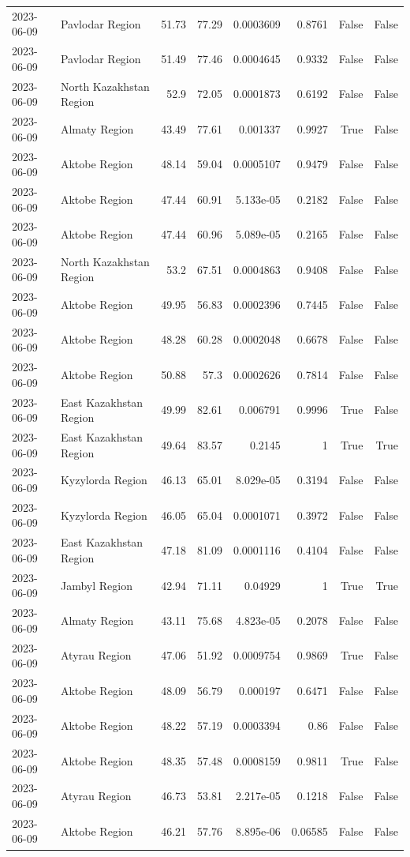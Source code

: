 \begin{table}
\begin{tabular}{llrrrrrr}
2023-06-09 & Pavlodar Region & 51.73 & 77.29 & 0.0003609 & 0.8761 & False & False \\
2023-06-09 & Pavlodar Region & 51.49 & 77.46 & 0.0004645 & 0.9332 & False & False \\
2023-06-09 & North Kazakhstan Region & 52.9 & 72.05 & 0.0001873 & 0.6192 & False & False \\
2023-06-09 & Almaty Region & 43.49 & 77.61 & 0.001337 & 0.9927 & True & False \\
2023-06-09 & Aktobe Region & 48.14 & 59.04 & 0.0005107 & 0.9479 & False & False \\
2023-06-09 & Aktobe Region & 47.44 & 60.91 & 5.133e-05 & 0.2182 & False & False \\
2023-06-09 & Aktobe Region & 47.44 & 60.96 & 5.089e-05 & 0.2165 & False & False \\
2023-06-09 & North Kazakhstan Region & 53.2 & 67.51 & 0.0004863 & 0.9408 & False & False \\
2023-06-09 & Aktobe Region & 49.95 & 56.83 & 0.0002396 & 0.7445 & False & False \\
2023-06-09 & Aktobe Region & 48.28 & 60.28 & 0.0002048 & 0.6678 & False & False \\
2023-06-09 & Aktobe Region & 50.88 & 57.3 & 0.0002626 & 0.7814 & False & False \\
2023-06-09 & East Kazakhstan Region & 49.99 & 82.61 & 0.006791 & 0.9996 & True & False \\
2023-06-09 & East Kazakhstan Region & 49.64 & 83.57 & 0.2145 & 1 & True & True \\
2023-06-09 & Kyzylorda Region & 46.13 & 65.01 & 8.029e-05 & 0.3194 & False & False \\
2023-06-09 & Kyzylorda Region & 46.05 & 65.04 & 0.0001071 & 0.3972 & False & False \\
2023-06-09 & East Kazakhstan Region & 47.18 & 81.09 & 0.0001116 & 0.4104 & False & False \\
2023-06-09 & Jambyl Region & 42.94 & 71.11 & 0.04929 & 1 & True & True \\
2023-06-09 & Almaty Region & 43.11 & 75.68 & 4.823e-05 & 0.2078 & False & False \\
2023-06-09 & Atyrau Region & 47.06 & 51.92 & 0.0009754 & 0.9869 & True & False \\
2023-06-09 & Aktobe Region & 48.09 & 56.79 & 0.000197 & 0.6471 & False & False \\
2023-06-09 & Aktobe Region & 48.22 & 57.19 & 0.0003394 & 0.86 & False & False \\
2023-06-09 & Aktobe Region & 48.35 & 57.48 & 0.0008159 & 0.9811 & True & False \\
2023-06-09 & Atyrau Region & 46.73 & 53.81 & 2.217e-05 & 0.1218 & False & False \\
2023-06-09 & Aktobe Region & 46.21 & 57.76 & 8.895e-06 & 0.06585 & False & False \\
\bottomrule
\end{tabular}
\end{table}
